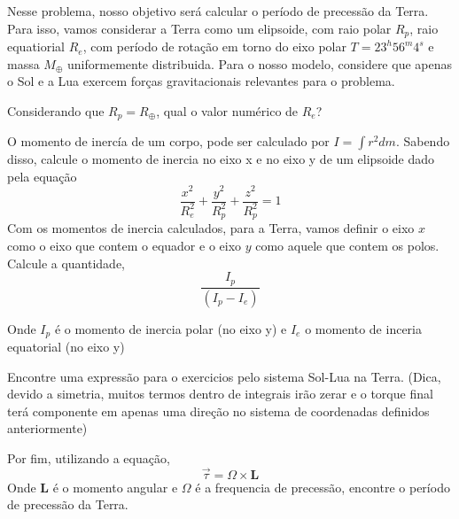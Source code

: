 \documentclass[11pt]{article}
\begin{document}
\begin{pproblem}
    Nesse problema, nosso objetivo será calcular o período de precessão da Terra. Para isso, vamos considerar a Terra como um elipsoide, com raio polar $R_p$, raio equatiorial $R_e$, com período de rotação em torno do eixo polar $T = 23^h56^m4^s$ e massa $M_\oplus$ uniformemente distribuida. Para o nosso modelo, considere que apenas o Sol e a Lua exercem forças gravitacionais relevantes para o problema.
    \begin{alternativas}
        \item Considerando que $R_p = R_\oplus$, qual o valor numérico de $R_e$?
        
        \item O momento de inercía de um corpo, pode ser calculado por $I = \int r^2 dm$. Sabendo disso, calcule o momento de inercia no eixo x e no eixo y de um elipsoide dado pela equação 
        $$\frac{x^2}{R_e^2} + \frac{y^2}{R_p^2} + \frac{z^2}{R_p^2}= 1$$
        Com os momentos de inercia calculados, para a Terra, vamos definir o eixo $x$ como o eixo que contem o equador e o eixo $y$ como aquele que contem os polos. Calcule a quantidade, 
        $$\frac{I_p}{(I_p-I_e)}$$

        Onde $I_p$ é o momento de inercia polar (no eixo y) e $I_e$ o momento de inceria equatorial (no eixo y)
        

        \item Encontre uma expressão para o exercicios pelo sistema Sol-Lua na Terra. (Dica, devido a simetria, muitos termos dentro de integrais irão zerar e o torque final terá componente em apenas uma direção no sistema de coordenadas definidos anteriormente)
        \item Por fim, utilizando a equação, 
        $$\vec{\tau} = \Omega \times \mathbf{L} $$
        Onde $\mathbf{L}$ é o momento angular e $\Omega$ é a frequencia de precessão, encontre o período de precessão da Terra.
    \end{alternativas}
\end{pproblem}
    
\end{document}

